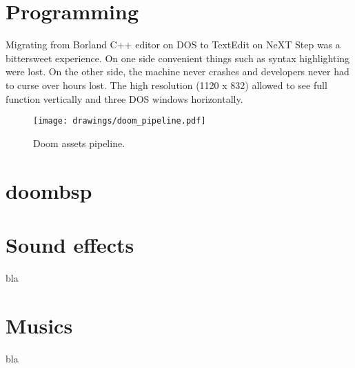 \pagebreak
\section{Programming}
Migrating from Borland C++ editor on DOS to TextEdit on NeXT Step was a bittersweet experience. On one side convenient things such as syntax highlighting were lost. On the other side, the machine never crashes and developers never had to curse over hours lost. The high resolution (1120 x 832) allowed to see full function vertically and three DOS windows horizontally. \\
\par
{}
\begin{figure}[H]
\centering
\texttt{[image: drawings/doom\_pipeline.pdf]}
\caption{Doom assets pipeline.}
\end{figure}
\par

\section{doombsp}
\par
{}
\par



\section{Sound effects}
bla
\section{Musics}
bla